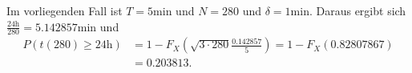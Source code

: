 {\begin{loesung}
\begin{teilaufgaben}
Im vorliegenden Fall ist $T=\text{5min}$ und $N=280$ und $\delta=\text{1min}$.
Daraus ergibt sich $\frac{\text{24h}}{280}=5.142857\text{min}$ und
\begin{align*}
P(t(280)\ge \text{24h})
&=
1-F_X(
\sqrt{3\cdot 280}\frac{0.142857}{5}
)
=1-F_X(0.82807867)
\\
&
=0.203813.
\end{align*}
\end{teilaufgaben}
\end{loesung}
}{ }

